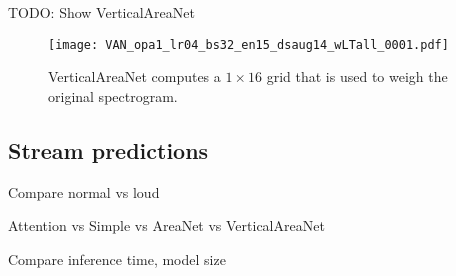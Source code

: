 TODO: Show VerticalAreaNet

\begin{figure}[t!]
    \centering
    \texttt{[image: VAN\_opa1\_lr04\_bs32\_en15\_dsaug14\_wLTall\_0001.pdf]}
    \caption{VerticalAreaNet computes a $1 \times 16$ grid that is used to
        weigh the original 
    spectrogram.}%
    \label{fig:attention_weights_vertical}
\end{figure}
\subsection{Stream predictions}

Compare normal vs loud

Attention vs Simple vs AreaNet vs VerticalAreaNet

Compare inference time, model size
